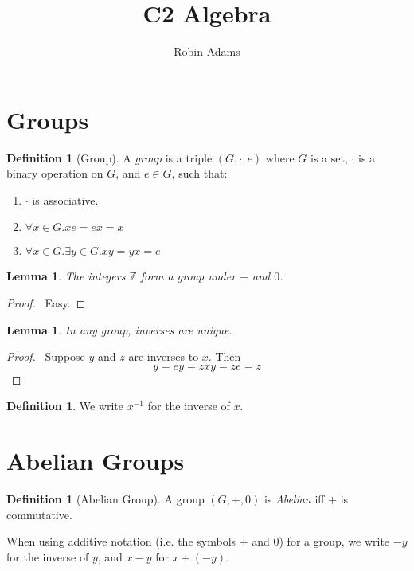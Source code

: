 \documentclass{article}
\title{C2 Algebra}
\author{Robin Adams}
\let\qed\relax
\newtheorem{lemma}[axiom]{Lemma}
\theoremstyle{definition}
\newtheorem{definition}[axiom]{Definition}
\begin{document}
    \maketitle

    \section{Groups}

    \begin{definition}[Group]
        A \emph{group} is a triple $(G, \cdot, e)$ where $G$ is a set, $\cdot$ is a binary operation on $G$,
        and $e \in G$, such that:
        \begin{enumerate}
            \item $\cdot$ is associative.
            \item $\forall x \in G. xe = ex = x$
            \item $\forall x \in G. \exists y \in G. xy = yx = e$
        \end{enumerate}
    \end{definition}

    \begin{lemma}
        The integers $\mathbb{Z}$ form a group under $+$ and $0$.
    \end{lemma}

    \begin{proof}
        \pf\ Easy. \qed
    \end{proof}

    \begin{lemma}
        In any group, inverses are unique.
    \end{lemma}

    \begin{proof}
        \pf\ Suppose $y$ and $z$ are inverses to $x$. Then
        \[ y = ey = zxy = ze = z \]
        \qed
    \end{proof}

    \begin{definition}
        We write $x^{-1}$ for the inverse of $x$.
    \end{definition}

    \section{Abelian Groups}

    \begin{definition}[Abelian Group]
        A group $(G, +, 0)$ is \emph{Abelian} iff $+$ is commutative.

        When using additive notation (i.e. the symbols $+$ and $0$) for a group,
        we write $-y$ for the inverse of $y$, and $x-y$ for $x+(-y)$.
    \end{definition}
\end{document}
